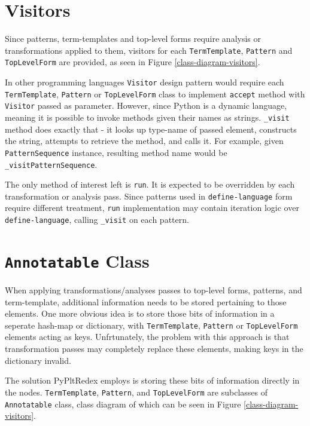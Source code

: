 \section{Visitors}
\label{section:visitors}
Since patterns, term-templates and top-level forms require analysis or transformations applied to them, visitors for each \texttt{TermTemplate}, \texttt{Pattern} and \texttt{TopLevelForm} are provided, as seen in Figure \ref{class-diagram-visitors}. 

In other programming languages \texttt{Visitor} design pattern would require each \texttt{TermTemplate}, \texttt{Pattern} or \texttt{TopLevelForm} class to implement \texttt{accept} method with \texttt{Visitor} passed as parameter. However, since Python is a dynamic language, meaning it is possible to invoke methods given their names as strings. \texttt{\_visit} method does exactly that - it looks up type-name of passed element, constructs the string, attempts to retrieve the method, and calls it. For example, given \texttt{PatternSequence} instance, resulting method name would be \texttt{\_visitPatternSequence}.

The only method of interest left is \texttt{run}. It is expected to be overridden by each transformation or analysis pass.  Since patterns used in \texttt{define-language} form require different treatment, \texttt{run} implementation may contain iteration logic over \texttt{define-language}, calling \texttt{\_visit} on each pattern. 

\section{\texttt{Annotatable} Class}

When applying transformations/analyses passes to top-level forms, patterns, and term-template, additional information needs to be stored pertaining to those elements. One more obvious idea is to store those bits of information in a seperate hash-map or dictionary, with \texttt{TermTemplate}, \texttt{Pattern} or \texttt{TopLevelForm} elements acting as keys. Unfrtunately, the problem with this approach is that transformation passes may completely replace these elements, making keys in the dictionary invalid.

The solution PyPltRedex employs is storing these bits of information directly in the nodes. \texttt{TermTemplate}, \texttt{Pattern}, and \texttt{TopLevelForm} are subclasses of \texttt{Annotatable} class, class diagram of which can be seen in Figure \ref{class-diagram-visitors}.

